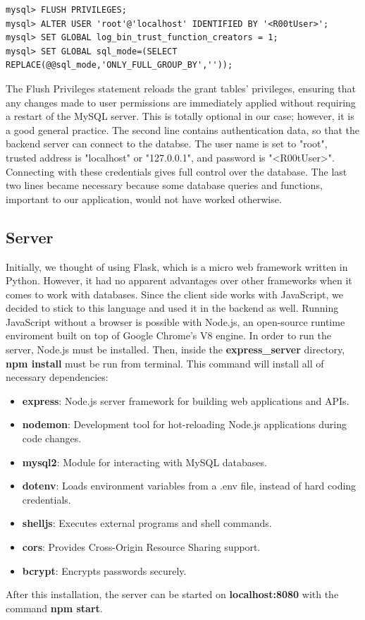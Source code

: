 \documentclass[12pt]{article}
\begin{document}
\begin{verbatim}
mysql> FLUSH PRIVILEGES;
mysql> ALTER USER 'root'@'localhost' IDENTIFIED BY '<R00tUser>';
mysql> SET GLOBAL log_bin_trust_function_creators = 1;
mysql> SET GLOBAL sql_mode=(SELECT REPLACE(@@sql_mode,'ONLY_FULL_GROUP_BY',''));
\end{verbatim}

The Flush Privileges statement reloads the grant tables' privileges, ensuring that any changes made to user permissions are immediately applied without requiring a restart of the MySQL server. This is totally optional in our case; however, it is a good general practice. The second line contains authentication data, so that the backend server can connect to the databse. The user name is set to "root", trusted address is "localhost" or "127.0.0.1", and password is "<R00tUser>". Connecting with these credentials gives full control over the database. The last two lines became necessary because some database queries and functions, important to our application, would not have worked otherwise. 

\newpage

\subsection{Server}
\label{sec:orge8d7dfe}
Initially, we thought of using Flask, which is a micro web framework written in Python. However, it had no apparent advantages over other frameworks when it comes to work with databases. Since the client side works with JavaScript, we decided to stick to this language and used it in the backend as well. Running JavaScript without a browser is possible with Node.js, an open-source runtime enviroment built on top of Google Chrome's V8 engine.
In order to run the server, Node.js must be installed. Then, inside the \textbf{express\_server} directory, \textbf{npm install} must be run from terminal. This command will install all of necessary dependencies:
\begin{itemize}
\item \textbf{express}: Node.js server framework for building web applications and APIs.
\item \textbf{nodemon}: Development tool for hot-reloading Node.js applications during code changes.
\item \textbf{mysql2}: Module for interacting with MySQL databases.
\item \textbf{dotenv}: Loads environment variables from a .env file, instead of hard coding credentials.
\item \textbf{shelljs}: Executes external programs and shell commands.
\item \textbf{cors}: Provides Cross-Origin Resource Sharing support.
\item \textbf{bcrypt}: Encrypts passwords securely.
\end{itemize}
After this installation, the server can be started on \textbf{localhost:8080} with the command \textbf{npm start}.
\end{document}

